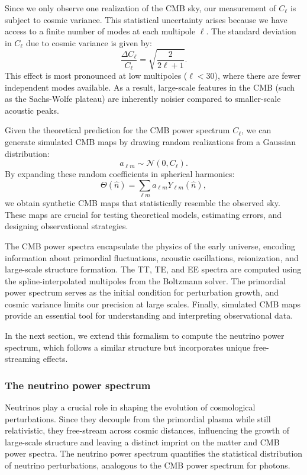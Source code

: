\documentclass{aa}
\begin{document}
Since we only observe one realization of the CMB sky, our measurement of $C_\ell$ is subject to cosmic variance. This statistical uncertainty arises because we have access to a finite number of modes at each multipole $\ell$. The standard deviation in $C_\ell$ due to cosmic variance is given by:
\begin{equation}
\frac{\Delta C_\ell}{C_\ell} = \sqrt{\frac{2}{2\ell+1}}.
\end{equation}
This effect is most pronounced at low multipoles (\(\ell < 30\)), where there are fewer independent modes available. As a result, large-scale features in the CMB (such as the Sachs-Wolfe plateau) are inherently noisier compared to smaller-scale acoustic peaks.

Given the theoretical prediction for the CMB power spectrum $C_\ell$, we can generate simulated CMB maps by drawing random realizations from a Gaussian distribution:
\begin{equation}
a_{\ell m} \sim \mathcal{N}(0, C_\ell).
\end{equation}
By expanding these random coefficients in spherical harmonics:
\begin{equation}
\Theta(\hat{n}) = \sum_{\ell m} a_{\ell m} Y_{\ell m} (\hat{n}),
\end{equation}
we obtain synthetic CMB maps that statistically resemble the observed sky. These maps are crucial for testing theoretical models, estimating errors, and designing observational strategies. 

The CMB power spectra encapsulate the physics of the early universe, encoding information about primordial fluctuations, acoustic oscillations, reionization, and large-scale structure formation. The TT, TE, and EE spectra are computed using the spline-interpolated multipoles from the Boltzmann solver. The primordial power spectrum serves as the initial condition for perturbation growth, and cosmic variance limits our precision at large scales. Finally, simulated CMB maps provide an essential tool for understanding and interpreting observational data.  

In the next section, we extend this formalism to compute the neutrino power spectrum, which follows a similar structure but incorporates unique free-streaming effects.
\color{black}






\subsubsection{The neutrino power spectrum}
\color{Plum}
Neutrinos play a crucial role in shaping the evolution of cosmological perturbations. Since they decouple from the primordial plasma while still relativistic, they free-stream across cosmic distances, influencing the growth of large-scale structure and leaving a distinct imprint on the matter and CMB power spectra. The neutrino power spectrum quantifies the statistical distribution of neutrino perturbations, analogous to the CMB power spectrum for photons.
\end{document}
